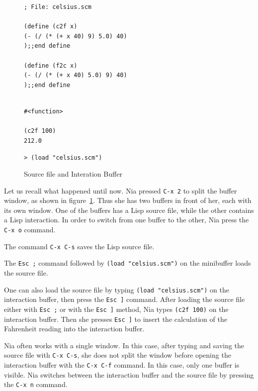 \documentclass[a4paper,12pt]{book}
\newenvironment{fmpage}[1]
           {\begin{lrbox}{\fmbox}\begin{minipage}{#1}}
           {\end{minipage}\end{lrbox}\fbox{\usebox{\fmbox}}}
\begin{document}
\begin{figure}[!b]
\begin{fmpage}{0.8\linewidth}
\begin{verbatim}
; File: celsius.scm

(define (c2f x)
(- (/ (* (+ x 40) 9) 5.0) 40)
);;end define

(define (f2c x)
(- (/ (* (+ x 40) 5.0) 9) 40)
);;end define
\end{verbatim}
\end{fmpage}

\begin{fmpage}{0.8\linewidth}
\begin{verbatim}

#<function>

(c2f 100)
212.0

\end{verbatim}
\end{fmpage}

\begin{fmpage}{0.8\linewidth}
\verb|> (load "celsius.scm")|
\end{fmpage}
\caption{Source file and Interation Buffer}
\label{fig:repl}
\end{figure}

Let us recall what happened until now.
Nia pressed \verb|C-x 2| to split 
the buffer window, as shown in figure~\ref{fig:repl}.
Thus she has two buffers in front of her,
each with its own window. One of the buffers has
a Lisp source file, while the other contains a Lisp 
interaction. In order to  switch
from one buffer to the other,
Nia press the \verb|C-x o| command.

The command \verb|C-x C-s| saves the Lisp source 
file. 

The \verb|Esc ;| command followed
by \verb|(load "celsius.scm")| on the minibuffer
loads the  source file.

One can also load the source file
by typing \verb|(load "celsius.scm")|
on the interaction buffer, 
then press the \verb|Esc ]| command.
After loading the source file either
with \verb|Esc ;| or with the \verb|Esc ]| method,
Nia types \verb|(c2f 100)| on the interaction
buffer. Then she presses \verb|Esc ]| to
insert the calculation of the Fahrenheit reading
into the interaction buffer.

Nia often works with a single window. 
In this case, after typing and saving
the source file with \verb|C-x C-s|,
she does not split the window
before opening the interaction buffer with the
\verb|C-x C-f| command. In this case,
only one buffer is visible. Nia switches 
between the interaction buffer and
the source file by pressing the  \verb|C-x n|
command. 
\end{document}
